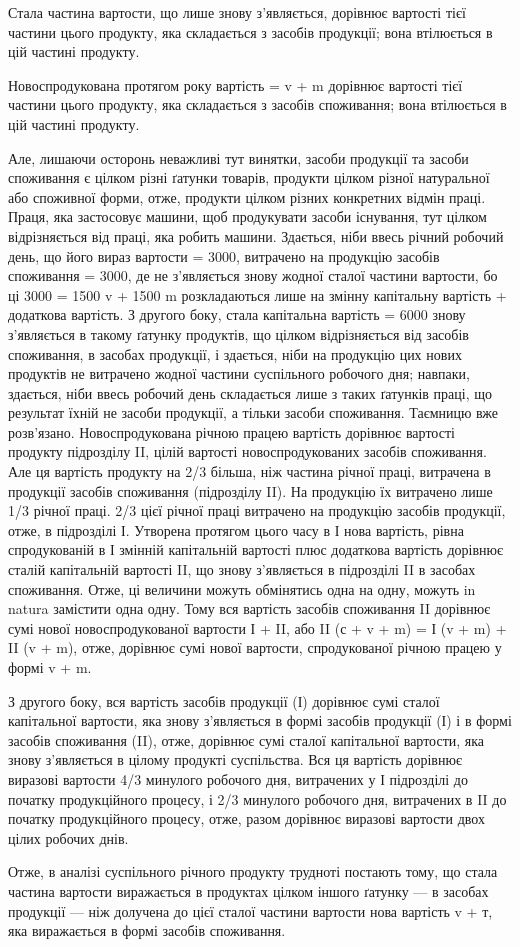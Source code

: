 Стала частина вартости, що лише знову з’являється, дорівнює вартості
тієї частини цього продукту, яка складається з засобів продукції;
вона втілюється в цій частині продукту.

Новоспродукована протягом року вартість = v + m дорівнює вартості
тієї частини цього продукту, яка складається з засобів споживання;
вона втілюється в цій частині продукту.

Але, лишаючи осторонь неважливі тут винятки, засоби продукції та
засоби споживання є цілком різні ґатунки товарів, продукти цілком різної
натуральної або споживної форми, отже, продукти цілком різних конкретних
відмін праці. Праця, яка застосовує машини, щоб продукувати
засоби існування, тут цілком відрізняється від праці, яка робить машини.
Здається, ніби ввесь річний робочий день, що його вираз вартости = 3000,
витрачено на продукцію засобів споживання = 3000, де не з’являється
знову жодної сталої частини вартости, бо ці 3000 = 1500 v + 1500 m
розкладаються лише на змінну капітальну вартість + додаткова вартість. З
другого боку, стала капітальна вартість = 6000 знову з’являється в такому
ґатунку продуктів, що цілком відрізняється від засобів споживання,
в засобах продукції, і здається, ніби на продукцію цих нових продуктів
не витрачено жодної частини суспільного робочого дня; навпаки, здається,
ніби ввесь робочий день складається лише з таких ґатунків праці, що
результат їхній не засоби продукції, а тільки засоби споживання. Таємницю
вже розв’язано. Новоспродукована річною працею вартість дорівнює
вартості продукту підрозділу II, цілій вартості новоспродукованих засобів
споживання. Але ця вартість продукту на 2/3 більша, ніж частина річної
праці, витрачена в продукції засобів споживання (підрозділу II). На продукцію
їх витрачено лише 1/3 річної праці. 2/3 цієї річної праці витрачено
на продукцію засобів продукції, отже, в підрозділі І. Утворена протягом
цього часу в І нова вартість, рівна спродукованій в І змінній капітальній
вартості плюс додаткова вартість дорівнює сталій капітальній вартості II,
що знову з’являється в підрозділі II в засобах споживання. Отже, ці величини
можуть обмінятись одна на одну, можуть in natura замістити одна одну.
Тому вся вартість засобів споживання II дорівнює сумі нової новоспродукованої
вартости І + II, або II (с + v + m) = І (v + m) + II (v + m), отже, дорівнює
сумі нової вартости, спродукованої річною працею у формі v + m.

З другого боку, вся вартість засобів продукції (І) дорівнює сумі сталої
капітальної вартости, яка знову з’являється в формі засобів продукції
(І) і в формі засобів споживання (II), отже, дорівнює сумі сталої
капітальної вартости, яка знову з’являється в цілому продукті суспільства.
Вся ця вартість дорівнює виразові вартости 4/3 минулого робочого дня,
витрачених у І підрозділі до початку продукційного процесу, і 2/3
минулого робочого дня, витрачених в II до початку продукційного процесу,
отже, разом дорівнює виразові вартости двох цілих робочих днів.

Отже, в аналізі суспільного річного продукту трудноті постають тому,
що стала частина вартости виражається в продуктах цілком іншого ґатунку
— в засобах продукції — ніж долучена до цієї сталої частини
вартости нова вартість v + т, яка виражається в формі засобів споживання.
